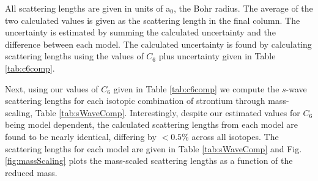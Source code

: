 \begin{table}[]
\centering
{}
\caption{Comparison of calculated $s$-wave scattering lengths}{All scattering lengths are given in units of a$_0$, the Bohr radius. The average of the two calculated values is given as the scattering length in the final column. The uncertainty is estimated by summing the calculated uncertainty and the difference between each model. The calculated uncertainty is found by calculating scattering lengths using the values of $C_6$ plus uncertainty given in Table \ref{tab:c6comp}.}
\label{tab:sWaveComp}
\end{table}
Next, using our values of $C_6$ given in Table \ref{tab:c6comp} we compute the $s$-wave scattering lengths for each isotopic combination of strontium through mass-scaling, Table \ref{tab:sWaveComp}.
Interestingly, despite our estimated values for $C_6$ being model dependent, the calculated scattering lengths from each model are found to be nearly identical, differing by $< 0.5$\% across all isotopes.
The scattering lengths for each model are given in Table \ref{tab:sWaveComp} and Fig.\,\ref{fig:massScaling} plots the mass-scaled scattering lengths as a function of the reduced mass.
